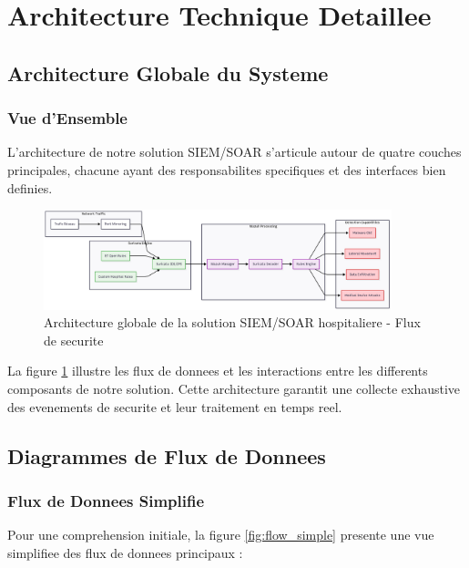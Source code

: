 \section{Architecture Technique Detaillee}

\subsection{Architecture Globale du Systeme}

\subsubsection{Vue d'Ensemble}

L'architecture de notre solution SIEM/SOAR s'articule autour de quatre couches principales, chacune ayant des responsabilites specifiques et des interfaces bien definies.

\begin{figure}[H]
    \centering
    \includegraphics[width=0.9\textwidth]{images/network_security_flow.png}
    \caption{Architecture globale de la solution SIEM/SOAR hospitaliere - Flux de securite}
    \label{fig:architecture_globale}
\end{figure}

La figure \ref{fig:architecture_globale} illustre les flux de donnees et les interactions entre les differents composants de notre solution. Cette architecture garantit une collecte exhaustive des evenements de securite et leur traitement en temps reel.

\subsection{Diagrammes de Flux de Donnees}

\subsubsection{Flux de Donnees Simplifie}

Pour une comprehension initiale, la figure \ref{fig:flow_simple} presente une vue simplifiee des flux de donnees principaux :

